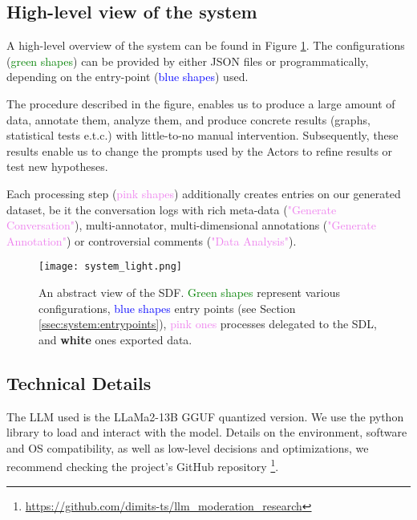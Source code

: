 \subsection{High-level view of the system}
\label{ssec:system:overview}

A high-level overview of the system can be found in Figure \ref{fig::system}. The configurations (\textcolor{green}{green shapes}) can be provided by either JSON files or programmatically, depending on the entry-point (\textcolor{blue}{blue shapes}) used. 

The procedure described in the figure, enables us to produce a large amount of data, annotate them, analyze them, and produce concrete results (graphs, statistical tests e.t.c.) with little-to-no manual intervention. Subsequently, these results enable us to change the prompts used by the Actors to refine results or test new hypotheses.

Each processing step (\textcolor{violet}{pink shapes}) additionally creates entries on our generated dataset, be it the conversation logs with rich meta-data (\textcolor{violet}{"Generate Conversation"}), multi-annotator, multi-dimensional annotations (\textcolor{violet}{"Generate Annotation"}) or controversial comments (\textcolor{violet}{"Data Analysis"}).

\begin{figure}
	\centering
	\texttt{[image: system\_light.png]}
	\caption{An abstract view of the SDF. \textcolor{green}{Green shapes} represent various configurations, \textcolor{blue}{blue shapes} entry points (see Section \ref{ssec:system:entrypoints}), \textcolor{violet}{pink ones} processes delegated to the SDL, and \textbf{white} ones exported data.}
	\label{fig::system}
\end{figure}



\subsection{Technical Details}
\label{ssec:system:details}

The LLM used is the LLaMa2-13B GGUF quantized version. We use the  python library to load and interact with the model. Details on the environment, software and OS compatibility, as well as low-level decisions and optimizations, we recommend checking the project's GitHub repository \footnote{\url{https://github.com/dimits-ts/llm_moderation_research}}.

